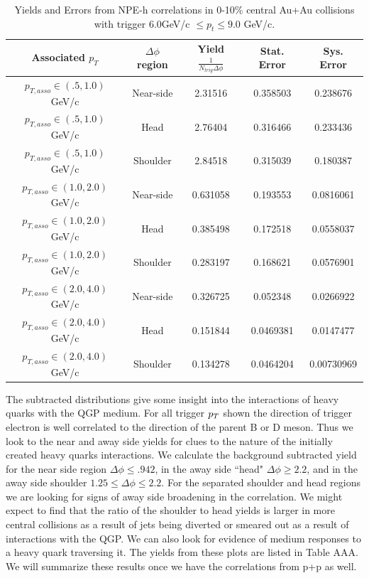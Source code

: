 \begin{table}
\centering
\begin{tabular}{|c|c|c|c|c|}
\hline
Associated $p_T$	& $\Delta\phi$ region & Yield $\frac{1}{N_{trig} \Delta\phi}$ & Stat. Error & Sys. Error\\
\hline
$p_{T,asso} \in(.5, 1.0)$ GeV/c  & Near-side & 2.31516 & 0.358503 & 0.238676 \\
\hline
$p_{T,asso} \in(.5, 1.0)$ GeV/c  & Head & 2.76404 & 0.316466 & 0.233436 \\
\hline
$p_{T,asso} \in(.5, 1.0)$ GeV/c  & Shoulder & 2.84518 & 0.315039 & 0.180387 \\
\hline
$p_{T,asso} \in(1.0, 2.0)$ GeV/c  & Near-side & 0.631058 & 0.193553 & 0.0816061 \\
\hline
$p_{T,asso} \in(1.0, 2.0)$ GeV/c  & Head & 0.385498 & 0.172518 & 0.0558037 \\
\hline
$p_{T,asso} \in(1.0, 2.0)$ GeV/c  & Shoulder & 0.283197 & 0.168621 & 0.0576901 \\
\hline
$p_{T,asso} \in(2.0, 4.0)$ GeV/c  & Near-side & 0.326725 & 0.052348 & 0.0266922 \\
\hline
$p_{T,asso} \in(2.0, 4.0)$ GeV/c  & Head & 0.151844 & 0.0469381 & 0.0147477 \\
\hline
$p_{T,asso} \in(2.0, 4.0)$ GeV/c  & Shoulder & 0.134278 & 0.0464204 & 0.00730969 \\
\hline
\end{tabular}
\caption[Yields and Errors in Au+Au Correlations, 0-10\%, High Trigger]{Yields and Errors from NPE-h correlations in 0-10\% central Au+Au collisions with trigger $6.0 $GeV/c $\leq p_t \leq 9.0$ GeV/c.}
\label{tab:AuAuYieldCentHigh}
\end{table} 

The subtracted distributions give some insight into the interactions of heavy quarks with the QGP medium. For all trigger $p_{T}$ shown the direction of trigger electron is well correlated to the direction of the parent B or D meson. Thus we look to the near and away side yields for clues to the nature of the initially created heavy quarks interactions. We calculate the background subtracted yield for the near side region $\Delta\phi \leq .942$, in the away side ``head" $\Delta\phi \geq 2.2$, and in the away side shoulder $1.25 \leq \Delta\phi \leq 2.2$. For the separated shoulder and head regions we are looking for signs of away side broadening in the correlation. We might expect to find that the ratio of the shoulder to head yields is larger in more central collisions as a result of jets being diverted or smeared out as a result of interactions with the QGP. We can also look for evidence of medium responses to a heavy quark traversing it. The yields from these plots are listed in Table AAA. We will summarize these results once we have the correlations from p+p as well. 

